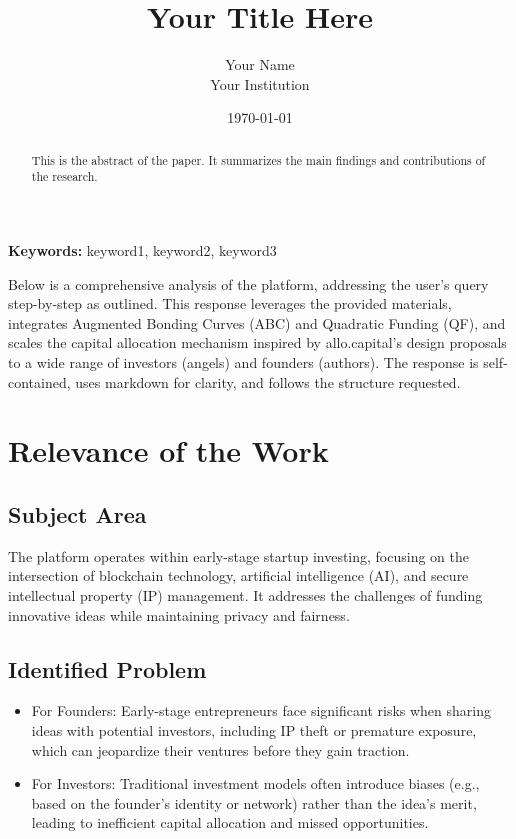 \documentclass[12pt]{article}
\begin{document}
\title{Your Title Here}
\author{Your Name \\ Your Institution}
\date{\today}
\maketitle

\begin{abstract}
  This is the abstract of the paper. It summarizes the main findings and contributions of the research.
\end{abstract}

\textbf{Keywords:} keyword1, keyword2, keyword3

Below is a comprehensive analysis of the platform, addressing the user's query step-by-step as outlined. This response leverages the provided materials, integrates Augmented Bonding Curves (ABC) and Quadratic Funding (QF), and scales the capital allocation mechanism inspired by allo.capital's design proposals to a wide range of investors (angels) and founders (authors). The response is self-contained, uses markdown for clarity, and follows the structure requested.

\section{Relevance of the Work}

\subsection{Subject Area}
The platform operates within early-stage startup investing, focusing on the intersection of blockchain technology, artificial intelligence (AI), and secure intellectual property (IP) management. It addresses the challenges of funding innovative ideas while maintaining privacy and fairness.

\subsection{Identified Problem}
\begin{itemize}
  \item For Founders: Early-stage entrepreneurs face significant risks when sharing ideas with potential investors, including IP theft or premature exposure, which can jeopardize their ventures before they gain traction.
  \item For Investors: Traditional investment models often introduce biases (e.g., based on the founder's identity or network) rather than the idea's merit, leading to inefficient capital allocation and missed opportunities.
\end{itemize}
\end{document}

